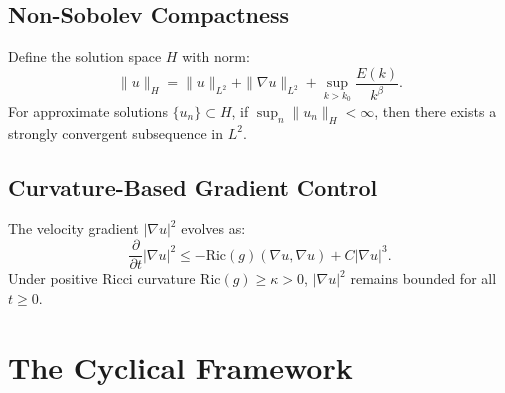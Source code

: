 \subsection{Non-Sobolev Compactness}
\begin{theorem}
Define the solution space $H$ with norm:
\begin{equation}
\|u\|_H = \|u\|_{L^2} + \|\nabla u\|_{L^2} + \sup_{k > k_0} \frac{E(k)}{k^\beta}.
\end{equation}
For approximate solutions $\{u_n\} \subset H$, if $\sup_n \|u_n\|_H < \infty$, then there exists a strongly convergent subsequence in $L^2$.
\end{theorem}

\subsection{Curvature-Based Gradient Control}
\begin{theorem}
The velocity gradient $|\nabla u|^2$ evolves as:
\begin{equation}
\frac{\partial}{\partial t} |\nabla u|^2 \leq -\text{Ric}(g)(\nabla u, \nabla u) + C|\nabla u|^3.
\end{equation}
Under positive Ricci curvature $\text{Ric}(g) \geq \kappa > 0$, $|\nabla u|^2$ remains bounded for all $t \geq 0$.
\end{theorem}

\section{The Cyclical Framework}

